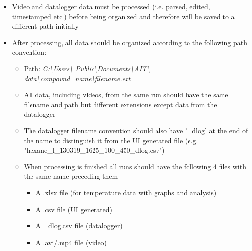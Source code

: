 \documentclass[letterpaper,11pt]{article}
\begin{document}
\begin{itemize}
    \item Video and datalogger data must be processed (i.e. parsed, edited, 
        timestamped etc.) before being organized and therefore will be saved to 
        a different path initially

    \item After processing, all data should be organized according to the 
        following path convention:
        \begin{itemize}
        \item Path: \textit{C:\textbackslash Users\textbackslash 
            Public\textbackslash Documents\textbackslash AIT\textbackslash 
            data\textbackslash compound\_name\textbackslash filename.ext}
        \item All data, including videos, from the same run should have the same
            filename and path but different extensions except data from the 
            datalogger
        \item The datalogger filename convention should also have '\_dlog' at 
            the end of the name to distinguish it from the UI generated file 
            (e.g. "hexane\_l\_130319\_1625\_100\_450\_dlog.csv")
        \item When processing is finished all runs should have the following 
            4 files with the same name preceding them
            \begin{itemize}
            \item A .xlsx file (for temperature data with graphs and analysis)
            \item A .csv file (UI generated)
            \item A \_dlog.csv file (datalogger)
            \item A .avi/.mp4 file (video)
            \end{itemize}
        \end{itemize}


\end{itemize}
\end{document}
